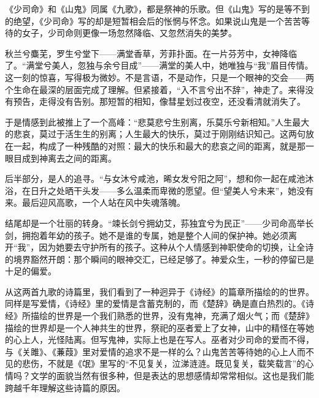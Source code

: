 \begin{appreciation}
《少司命》和《山鬼》同属《九歌》，都是祭神的乐歌。但《山鬼》写的是等不到的绝望，《少司命》写的却是短暂相会后的怅惘与怀念。如果说山鬼是一个苦苦等待的女子，少司命则更像一场忽然降临、又忽然消失的美梦。

秋兰兮麋芜，罗生兮堂下——满堂香草，芳菲扑面。在一片芬芳中，女神降临了。“满堂兮美人，忽独与余兮目成”——满堂的美人中，她唯独与“我”眉目传情。这一刻的惊喜，写得极为微妙。不是言语，不是动作，只是一个眼神的交会——两个生命在最深的层面完成了理解。但紧接着，“入不言兮出不辞”，神走了。来得没有预告，走得没有告别。那短暂的相知，像彗星划过夜空，还没看清就消失了。

于是情感到此被推上了一个高峰：“悲莫悲兮生别离，乐莫乐兮新相知。”人生最大的悲哀，莫过于活生生的别离；人生最大的快乐，莫过于刚刚结识知己。这两句放在一起，构成了一种残酷的对照：最大的快乐和最大的悲哀之间的距离，就是那一眼目成到神离去之间的距离。

后半部分，是人的追寻。“与女沐兮咸池，晞女发兮阳之阿”，想和你一起在咸池沐浴，在日升之处晒干头发——多么温柔而卑微的愿望。但“望美人兮未来”，她没有来。最后迎风高歌，一个人站在风中失魂落魄。

结尾却是一个壮丽的转身。“竦长剑兮拥幼艾，荪独宜兮为民正”——少司命高举长剑，拥抱着年幼的孩子。她不是谁的专属，她是整个人间的保护神。她必须离开“我”，因为她要去守护所有的孩子。这种从个人情感到神职使命的切换，让全诗的境界豁然开朗：那个瞬间的眼神交汇，已经足够了。神爱众生，一秒的停留已是十足的偏爱。

从这两首九歌的诗篇里，我们看到了一种迥异于《诗经》的篇章所描绘的的世界。同样是写爱情，《诗经》里的爱情是含蓄克制的，而《楚辞》确是直白热烈的。《诗经》所描绘的世界是一个我们熟悉的世界，没有鬼神，充满了烟火气；而《楚辞》描绘的世界却是一个人神共生的世界，祭祀的巫者爱上了女神，山中的精怪在等她的心上人，光怪陆离。但写鬼神，实际上也是在写人。巫者对少司命的爱而不得，与《关雎》、《蒹葭》里对爱情的追求不是一样的么？山鬼苦苦等待她的心上人而不见的悲伤，不就是《氓》里写的“不见复关，泣涕涟涟。既见复关，载笑载言”的心情吗？文学的面貌当然有很多种，但是表达的思想感情却常常相似。这也是我们能跨越千年理解这些诗篇的原因。
\end{appreciation}
